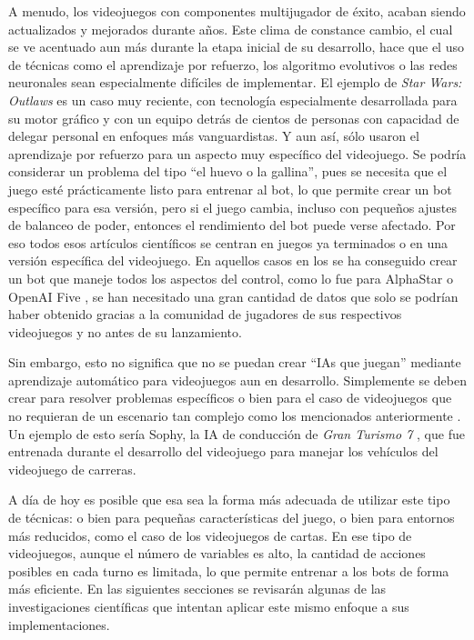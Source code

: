 A menudo, los videojuegos con componentes multijugador de éxito, acaban siendo actualizados y mejorados durante años. Este clima de constance cambio, el cual se ve acentuado aun más durante la etapa inicial de su desarrollo, hace que el uso de técnicas como el aprendizaje por refuerzo, los algoritmo evolutivos o las redes neuronales sean especialmente difíciles de implementar. El ejemplo de \textit{Star Wars: Outlaws} es un caso muy reciente, con tecnología especialmente desarrollada para su motor gráfico y con un equipo detrás de cientos de personas con capacidad de delegar personal en enfoques más vanguardistas. Y aun así, sólo usaron el aprendizaje por refuerzo para un aspecto muy específico del videojuego. Se podría considerar un problema del tipo ``el huevo o la gallina'', pues se necesita que el juego esté prácticamente listo para entrenar al bot, lo que permite crear un bot específico para esa versión, pero si el juego cambia, incluso con pequeños ajustes de balanceo de poder, entonces el rendimiento del bot puede verse afectado. Por eso todos esos artículos científicos se centran en juegos ya terminados o en una versión específica del videojuego. En aquellos casos en los se ha conseguido crear un bot que maneje todos los aspectos del control, como lo fue para AlphaStar \cite{vinyals_grandmaster_2019} o OpenAI Five \cite{openai_dota_2019}, se han necesitado una gran cantidad de datos que solo se podrían haber obtenido gracias a la comunidad de jugadores de sus respectivos videojuegos y no antes de su lanzamiento.

Sin embargo, esto no significa que no se puedan crear ``IAs que juegan'' mediante aprendizaje automático para videojuegos aun en desarrollo. Simplemente se deben crear para resolver problemas específicos o bien para el caso de videojuegos que no requieran de un escenario tan complejo como los mencionados anteriormente \cite{ai_and_games_why_2024}. Un ejemplo de esto sería Sophy, la IA de conducción de \textit{Gran Turismo 7} \cite{wurman_outracing_2022}, que fue entrenada durante el desarrollo del videojuego para manejar los vehículos del videojuego de carreras.

A día de hoy es posible que esa sea la forma más adecuada de utilizar este tipo de técnicas: o bien para pequeñas características del juego, o bien para entornos más reducidos, como el caso de los videojuegos de cartas. En ese tipo de videojuegos, aunque el número de variables es alto, la cantidad de acciones posibles en cada turno es limitada, lo que permite entrenar a los bots de forma más eficiente. En las siguientes secciones se revisarán algunas de las investigaciones científicas que intentan aplicar este mismo enfoque a sus implementaciones.

